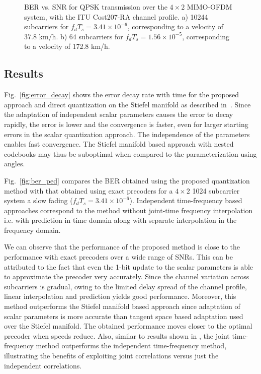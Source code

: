 \documentclass[11pt,a4paper]{report}
\begin{document}
\begin{figure}
\begin{subfigure}[b]{0.5\columnwidth}
\caption{}
\label{fig:ber_veh}
\end{subfigure}   
\caption{BER vs. SNR for QPSK transmission over the $4\times 2$
      MIMO-OFDM system, with the ITU Cost207-RA channel profile.
      a) 10244 subcarriers for $f_dT_s = 3.41\times 10^{-6}$, 
      corresponding to a velocity of 37.8 km/h. b) 64 subcarriers 
      for $f_dT_s = 1.56\times 10^{-5}$, 
      corresponding to a velocity of 172.8 km/h.
      }
\end{figure}

\subsection{Results}
Fig.~\ref{fig:error_decay} shows the error decay rate with time for
the proposed approach and direct quantization on the Stiefel manifold
as described in~\cite{Gupt1905:Predictive}. Since the adaptation of
independent scalar parameters causes the error to decay rapidly, the
error is lower and the convergence is faster, even for larger starting
errors in the scalar quantization approach. The independence of the
parameters enables fast convergence. The Stiefel manifold based
approach with nested codebooks may thus be suboptimal when compared to
the parameterization using angles.

Fig.~\ref{fig:ber_ped} compares the BER obtained using the proposed
quantization method with that obtained using exact precoders for a
$4\times 2$ 1024 subcarrier system a slow fading
($f_dT_s = 3.41 \times 10^{-6}$). Independent time-frequency based
approaches correspond to the method without joint-time frequency
interpolation i.e. with prediction in time domain along with separate interpolation in the frequency domain.

We can observe that the performance of the proposed
method is close to the performance with exact precoders over a wide
range of SNRs. This can be attributed to the fact that even the 1-bit
update to the scalar parameters is able to approximate the precoder
very accurately. Since the channel variation across subcarriers is
gradual, owing to the limited delay spread of the channel profile,
linear interpolation and prediction yields good performance. Moreover,
this method outperforms the Stiefel manifold based approach since
adaptation of scalar parameters is more accurate than tangent space
based adaptation used over the Stiefel manifold. The obtained
performance moves closer to the optimal precoder when speeds reduce.
Also, similar to results shown in \cite{Gupt1905:Predictive}, the
joint time-frequency method outperforms the independent time-frequency
method, illustrating the benefits of exploiting joint correlations
versus just the independent correlations.
\end{document}

